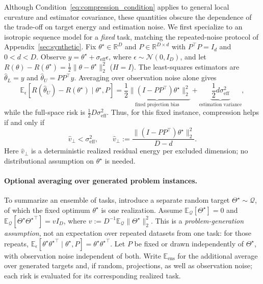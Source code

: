 Although Condition~\eqref{eq:compression_condition} applies to general local curvature and estimator covariance, these quantities obscure the dependence of the trade-off on target energy and estimation noise.
We first specialize to an isotropic sequence model for a \emph{fixed} task, matching the repeated-noise protocol of Appendix~\ref{sec:synthetic}.
Fix $\theta^\star\in\mathbb R^D$ and $P\in\mathbb R^{D\times d}$ with $P^\top P=I_d$ and $0<d<D$.
Observe $y=\theta^\star+\sigma_{\mathrm{eff}}\epsilon$, where $\epsilon\sim\mathcal N(0,I_D)$, and let
$R(\theta)-R(\theta^\star)=\frac12\|\theta-\theta^\star\|_2^2$ ($H=I$).
The least-squares estimators are $\hat\theta_L=y$ and $\hat\theta_U=PP^\top y$.
Averaging over observation noise alone gives
\begin{equation}
\mathbb E_\epsilon\!\left[R(\hat\theta_U)-R(\theta^\star)\mid\theta^\star,P\right]
=
\underbrace{\frac12\|(I-PP^\top)\theta^\star\|_2^2}_{\text{fixed projection bias}}
+
\underbrace{\frac12d\sigma_{\mathrm{eff}}^2}_{\text{estimation variance}},
\label{eq:conditional_compressed_risk}
\end{equation}
while the full-space risk is $\frac12D\sigma_{\mathrm{eff}}^2$.
Thus, for this fixed instance, compression helps if and only if
\begin{equation}
\hat v_\perp<\sigma_{\mathrm{eff}}^2,
\qquad
\hat v_\perp:=\frac{\|(I-PP^\top)\theta^\star\|_2^2}{D-d}.
\label{eq:fixed_energy_noise_condition}
\end{equation}
Here $\hat v_\perp$ is a deterministic realized residual energy per excluded dimension; no distributional assumption on $\theta^\star$ is needed.

\paragraph{Optional averaging over generated problem instances.}
To summarize an ensemble of tasks, introduce a separate random target $\Theta^\star\sim\mathcal Q$, of which the fixed optimum $\theta^\star$ is one realization.
Assume
$\mathbb E_{\mathcal Q}[\Theta^\star]=0$ and
$\mathbb E_{\mathcal Q}[\Theta^\star{\Theta^\star}^\top]=vI_D$, where
$v:=D^{-1}\mathbb E_{\mathcal Q}\|\Theta^\star\|_2^2$.
This is a \emph{problem-generation assumption}, not an expectation over repeated datasets from one task: for those repeats,
$\mathbb E_\epsilon[\theta^\star{\theta^\star}^\top\mid\theta^\star,P]=\theta^\star{\theta^\star}^\top$.
Let $P$ be fixed or drawn independently of $\Theta^\star$, with observation noise independent of both.
Write $\mathbb E_{\mathrm{ens}}$ for the additional average over generated targets and, if random, projections, as well as observation noise; each risk is evaluated for its corresponding realized task.

